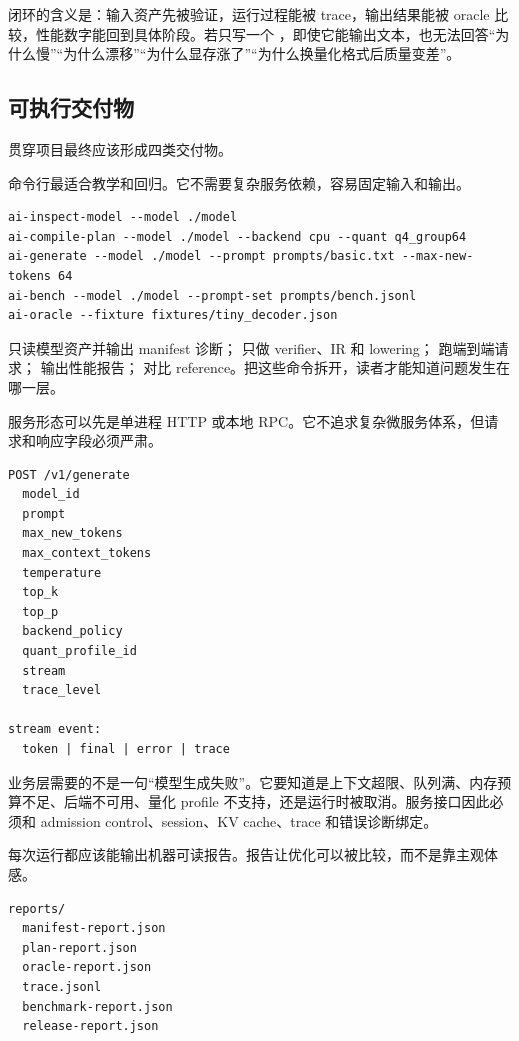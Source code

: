 闭环的含义是：输入资产先被验证，运行过程能被 trace，输出结果能被 oracle 比较，性能数字能回到具体阶段。若只写一个 ，即使它能输出文本，也无法回答“为什么慢”“为什么漂移”“为什么显存涨了”“为什么换量化格式后质量变差”。

\subsection{可执行交付物}

贯穿项目最终应该形成四类交付物。

 命令行最适合教学和回归。它不需要复杂服务依赖，容易固定输入和输出。

\begin{lstlisting}[numbers=none,caption={贯穿项目命令行工具}]
ai-inspect-model --model ./model
ai-compile-plan --model ./model --backend cpu --quant q4_group64
ai-generate --model ./model --prompt prompts/basic.txt --max-new-tokens 64
ai-bench --model ./model --prompt-set prompts/bench.jsonl
ai-oracle --fixture fixtures/tiny_decoder.json
\end{lstlisting}

 只读模型资产并输出 manifest 诊断； 只做 verifier、IR 和 lowering； 跑端到端请求； 输出性能报告； 对比 reference。把这些命令拆开，读者才能知道问题发生在哪一层。

 服务形态可以先是单进程 HTTP 或本地 RPC。它不追求复杂微服务体系，但请求和响应字段必须严肃。

\begin{lstlisting}[numbers=none,caption={本地推理服务接口}]
POST /v1/generate
  model_id
  prompt
  max_new_tokens
  max_context_tokens
  temperature
  top_k
  top_p
  backend_policy
  quant_profile_id
  stream
  trace_level

stream event:
  token | final | error | trace
\end{lstlisting}

业务层需要的不是一句“模型生成失败”。它要知道是上下文超限、队列满、内存预算不足、后端不可用、量化 profile 不支持，还是运行时被取消。服务接口因此必须和 admission control、session、KV cache、trace 和错误诊断绑定。

 每次运行都应该能输出机器可读报告。报告让优化可以被比较，而不是靠主观体感。

\begin{lstlisting}[numbers=none,caption={贯穿项目报告文件}]
reports/
  manifest-report.json
  plan-report.json
  oracle-report.json
  trace.jsonl
  benchmark-report.json
  release-report.json
\end{lstlisting}

